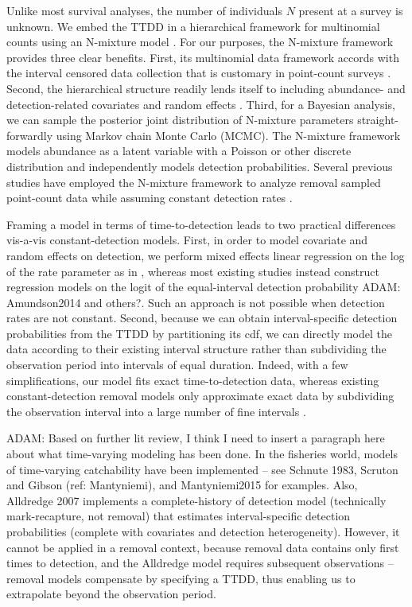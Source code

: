 \documentclass[useAMS,usenatbib,referee,12pt]{article}
\newcommand{\adam}[1]{{\color{blue} ADAM: #1}}
\begin{document}
Unlike most survival analyses, the number of individuals $N$ present at a survey is unknown.  
We embed the TTDD in a hierarchical framework for multinomial counts using an N-mixture model \citep{Wyatt2002, Royle2004NMixture}.  
For our purposes, the N-mixture framework provides three clear benefits.  
First, its multinomial data framework accords with the interval censored data collection that is customary in point-count surveys \citep{Ralph1995}.  
Second, the hierarchical structure readily lends itself to including abundance- and detection-related covariates and random effects \citep{Dorazio2005, Etterson2009, Amundson2014}.  
Third, for a Bayesian analysis, we can sample the posterior joint distribution of N-mixture parameters straight-forwardly using Markov chain Monte Carlo (MCMC).  
The N-mixture framework models abundance as a latent variable with a Poisson or other discrete distribution and independently models detection probabilities.  
Several previous studies have employed the N-mixture framework to analyze removal sampled point-count data while assuming constant detection rates \citep{Royle2004Generalized, Dorazio2005, Etterson2009, Solymos2013, Amundson2014}.  


Framing a model in terms of time-to-detection leads to two practical differences vis-a-vis constant-detection models.  
First, in order to model covariate and random effects on detection, we perform mixed effects linear regression on the log of the rate parameter as in \citet{Solymos2013}, whereas most existing studies instead construct regression models on the logit of the equal-interval detection probability \adam{Amundson2014 and others?}.  
Such an approach is not possible when detection rates are not constant.  
Second, because we can obtain interval-specific detection probabilities from the TTDD by partitioning its cdf, we can directly model the data according to their existing interval structure rather than subdividing the observation period into intervals of equal duration.  
Indeed, with a few simplifications, our model fits exact time-to-detection data, whereas existing constant-detection removal models only approximate exact data by subdividing the observation interval into a large number of fine intervals \citep{Reidy2011, Amundson2014}.

\adam{Based on further lit review, I think I need to insert a paragraph here about what time-varying modeling has been done.  
In the fisheries world, models of time-varying catchability have been implemented -- see Schnute 1983, Scruton and Gibson (ref: Mantyniemi), and Mantyniemi2015 for examples.  
Also, Alldredge 2007 implements a complete-history of detection model (technically mark-recapture, not removal) that estimates interval-specific detection probabilities (complete with covariates and detection heterogeneity).  
However, it cannot be applied in a removal context, because removal data contains only first times to detection, and the Alldredge model requires subsequent observations -- removal models compensate by specifying a TTDD, thus enabling us to extrapolate beyond the observation period.}  
\end{document}
